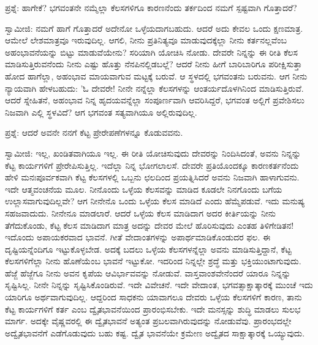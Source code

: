 ಪ್ರಶ್ನೆ: ಹಾಗೇಕೆ? ಭಗವಂತನೇ ನಮ್ಮೆಲ್ಲಾ ಕೆಲಸಗಳಿಗೂ ಕಾರಣನೆಂದು ತರ್ಕದಿಂದ ನಮಗೆ ಸ್ಪಷ್ಟವಾಗಿ ಗೊತ್ತಾದರೆ?

ಸ್ವಾಮೀಜಿ: ನಮಗೆ ಹಾಗೆ ಗೊತ್ತಾದರೆ ಅದೇನೋ ಒಳ್ಳೆಯದಾಗಬಹುದು. ಆದರೆ ಅದು ಕೇವಲ ಒಂದು ಕ್ಷಣಮಾತ್ರ. ಆಮೇಲೆ ಲೇಶಮಾತ್ರವೂ ಇರುವುದಿಲ್ಲ. ಆಗಲಿ, ನೀನು ಪ್ರತಿನಿತ್ಯವೂ ಮಾಡುವುದಕ್ಕೆಲ್ಲಾ ನೀನು ಕರ್ತನಲ್ಲವೆಂಬ ಅಹಂಭಾವನೆಯನ್ನು ಬಿಟ್ಟು ಮಾಡುವೆಯೇನು? ಸರಿಯಾಗಿ ಯೋಚಿಸಿ ನೋಡು. ದೇವರೇ ನಿನ್ನನ್ನು ಈ ರೀತಿ ಕೆಲಸ ಮಾಡಿಸುತ್ತಿರುವನೆಂದು ನೀನು ಎಷ್ಟು ಹೊತ್ತು ನೆನಪಿನಲ್ಲಿಡಬಲ್ಲೆ? ಆದರೆ ನೀನು ಹೀಗೆ ಬಾರಿಬಾರಿಗೂ ಪರೀಕ್ಷಿಸುತ್ತಾ ಹೋದ ಹಾಗೆಲ್ಲಾ, ಅಹಂಭಾವ ಮಾಯವಾಗುವ ಮಟ್ಟಕ್ಕೆ ಬರುವೆ. ಆ ಸ್ಥಳದಲ್ಲಿ ಭಗವಂತನು ಬರುವನು. ಆಗ ನೀನು ನ್ಯಾಯವಾಗಿ ಹೇಳಬಹುದು: 'ಓ ದೇವರೇ! ನೀನೇ ನನ್ನೆಲ್ಲಾ ಕೆಲಸಗಳನ್ನು ಆಂತರ್ಯದೊಳಗಿನಿಂದ ಮಾಡಿಸುತ್ತಿರುವೆ. ಆದರೆ ಸ್ನೇಹಿತನೆ, ಅಹಂಭಾವ ನಿನ್ನ ಹೃದಯವನ್ನೆಲ್ಲಾ ಸಂಪೂರ್ಣವಾಗಿ ಆವರಿಸಿದ್ದರೆ, ಭಗವಂತ ಅಲ್ಲಿಗೆ ಪ್ರವೇಶಿಸಲು ನಿಜವಾಗಿ ಎಲ್ಲಿ ಸ್ಥಳವಿದೆ? ಆಗ ಭಗವಂತ ಸತ್ಯವಾಗಿಯೂ ಅಲ್ಲಿರುವುದಿಲ್ಲ.

ಪ್ರಶ್ನೆ: ಆದರೆ ಅವನೇ ನನಗೆ ಕೆಟ್ಟ ಪ್ರೇರೇಪಣೆಗಳನ್ನೂ ಕೊಡುವವನು.

ಸ್ವಾಮೀಜಿ: ಇಲ್ಲ, ಖಂಡಿತವಾಗಿಯೂ ಇಲ್ಲ. ಈ ರೀತಿ ಯೋಚಿಸುವುದು ದೇವರನ್ನು ನಿಂದಿಸಿದಂತೆ, ಅವನು ನಿನ್ನನ್ನು ಕೆಟ್ಟ ಕಾರ್ಯಗಳಿಗೆ ಪ್ರೇರೇಪಿಸುತ್ತಿಲ್ಲ. ಇದೆಲ್ಲಾ ನಿನ್ನ ಭೋಗಲಾಲಸೆ. ದೇವರೇ ಪ್ರತಿಯೊಂದಕ್ಕೂ ಕಾರಣಕರ್ತನೆಂದು ಹೇಳಿ ಮನಃಪೂರ್ವಕವಾಗಿ ಕೆಟ್ಟ ಕೆಲಸಗಳಲ್ಲಿ ಒಬ್ಬನು ಛಲದಿಂದ ಪ್ರಯತ್ನಿಸಿದರೆ ಅವನು ನಿಜವಾಗಿ ಹಾಳಾಗುವನು. ಇದೇ ಆತ್ಮವಂಚನೆಯ ಮೂಲ. ನೀನೊಂದು ಒಳ್ಳೆಯ ಕೆಲಸವನ್ನು ಮಾಡಿದ ಕೂಡಲೇ ನಿನಗೊಂದು ಬಗೆಯ ಉಲ್ಲಾಸವಾಗುವುದಿಲ್ಲವೇ? ಆಗ ನೀನೇನೊ ಒಂದು ಒಳ್ಳೆಯ ಕೆಲಸ ಮಾಡಿದೆ ಎಂದು ಹೆಮ್ಮೆಪಡುವೆ. ಇದು ಮನುಷ್ಯ ಸಹಜವಾದುದು. ನೀನೇನೂ ಮಾಡಲಾರೆ. ಆದರೆ ಒಳ್ಳೆಯ ಕೆಲಸ ಮಾಡಿದಾಗ ಅದರ ಕೀರ್ತಿಯನ್ನು ನೀನು ತೆಗೆದುಕೊಂಡು, ಕೆಟ್ಟ ಕೆಲಸ ಮಾಡಿದಾಗ ಮಾತ್ರ ಅದನ್ನು ದೇವರ ಮೇಲೆ ಹೊರಿಸುವುದು ಎಂತಹ ತಿಳಿಗೇಡಿತನ! ಇದೊಂದು ಅಪಾಯಕರವಾದ ಭಾವನೆ. ಗೀತೆ ವೇದಾಂತಗಳನ್ನು ಅಪಾರ್ಥಮಾಡಿಕೊಂಡುದರ ಫಲ. ಈ ದೃಷ್ಟಿಯನ್ನೆಂದಿಗೂ ಇಟ್ಟುಕೊಳ್ಳಬೇಡ. ಅದಕ್ಕೆ ಬದಲು ಒಳ್ಳೆಯ ಕೆಲಸಗಳನ್ನೆಲ್ಲಾ ಅವನು ಮಾಡಿಸುತ್ತಿದ್ದಾನೆ, ಕೆಟ್ಟ ಕೆಲಸಗಳಿಗೆಲ್ಲಾ ನೀನು ಹೊಣೆಯೆಂಬ ಭಾವನೆ ಇಟ್ಟುಕೋ. ಇದರಿಂದ ನಿನ್ನಲ್ಲೇ ಶ್ರದ್ಧೆ ಮತ್ತು ಭಕ್ತಿಯುಂಟಾಗುವುದು. ಹೆಜ್ಜೆ ಹೆಜ್ಜೆಗೂ ನೀನು ಅವನ ಕೃಪೆಯ ಆವಿರ್ಭಾವವನ್ನು ನೋಡುವೆ. ವಾಸ್ತವಾಂಶವೇನೆಂದರೆ ಯಾರೂ ನಿನ್ನನ್ನು ಸೃಷ್ಟಿಸಿಲ್ಲ. ನೀನೇ ನಿನ್ನನ್ನು ಸೃಷ್ಟಿಸಿಕೊಂಡಿರುವೆ. ಇದೇ ವಿವೇಚನೆ. ಇದೇ ವೇದಾಂತ, ಭಗವತ್ಸಾಕ್ಷಾತ್ಕಾರಕ್ಕೆ ಮುಂಚೆ ಇದು ಯಾರಿಗೂ ಅರ್ಥವಾಗುವುದಿಲ್ಲ. ಆದ್ದರಿಂದ ಸಾಧಕನು ಯಾವಾಗಲೂ ದೇವರು ಒಳ್ಳೆಯ ಕೆಲಸಗಳಿಗೆ ಕಾರಣ, ತಾನು ಕೆಟ್ಟ ಕಾರ್ಯಗಳಿಗೆ ಕರ್ತ ಎಂಬ ದ್ವೈತಭಾವನೆಯಿಂದ ಪ್ರಾರಂಭಿಸಬೇಕು. ಇದೇ ಮನಸ್ಸನ್ನು ಶುದ್ಧಿ ಮಾಡಲು ಸುಲಭ ಮಾರ್ಗ. ಅದಕ್ಕೇ ವೈಷ್ಣವರಲ್ಲಿ ಈ ದ್ವೈತಭಾವನೆ ಅತ್ಯಂತ ಪ್ರಬಲವಾಗಿರುವುದನ್ನು ನೋಡುವೆವು. ಪ್ರಾರಂಭದಲ್ಲೇ ಅದ್ವೈತಭಾವನೆಗೆ ಎಡೆಗೊಡುವುದು ಬಹು ಕಷ್ಟ. ದ್ವೈತ ಭಾವನೆಯೇ ಕ್ರಮೇಣ ಅದ್ವೈತದ ಸಾಕ್ಷಾತ್ಕಾರಕ್ಕೆ ಒಯ್ಯುವುದು.

